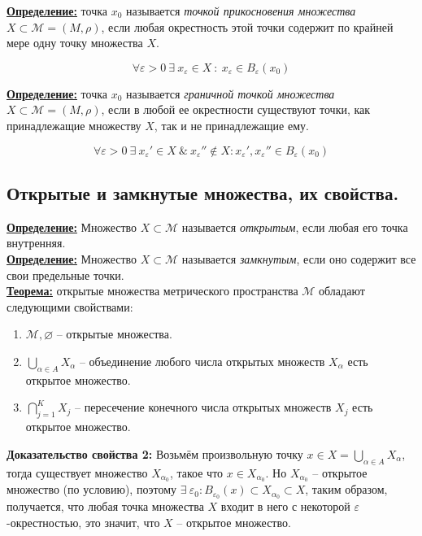 \documentclass[a4paper,12pt]{article} %
\begin{document}
	\underline{\textbf{Определение:}} точка $x_0$ называется \textit{точкой прикосновения множества} $X \subset \mathscr{M} = (M, \rho)$, если любая окрестность этой точки содержит по крайней мере одну точку множества $X$.
	
	\[ \forall \varepsilon > 0 ~ \exists ~ x_{\varepsilon} \in X ~ : ~ x_{\varepsilon} \in B_{\varepsilon}(x_0) \]
	
	\underline{\textbf{Определение:}} точка $x_0$ называется \textit{граничной точкой множества}  $X \subset \mathscr{M} = (M, \rho)$, если в любой ее окрестности существуют точки, как принадлежащие множеству $X$, так и не принадлежащие ему.
	
	\[ \forall \varepsilon > 0 ~ \exists ~ x_{\varepsilon}' \in X ~ \& ~ x_{\varepsilon}'' \notin X : x_{\varepsilon}', x_{\varepsilon}'' \in B_{\varepsilon}(x_0)\]
	
	\subsection{Открытые и замкнутые множества, их свойства.}
	
	\underline{\textbf{Определение:}} Множество $X \subset \mathscr{M}$ называется \textit{открытым}, если любая его точка внутренняя.\\
	
	\underline{\textbf{Определение:}} Множество $X \subset \mathscr{M}$ называется \textit{замкнутым}, если оно содержит все свои предельные точки.\\
	
	\underline{\textbf{Теорема:}} открытые множества метрического пространства $\mathscr{M}$ обладают следующими свойствами:
	
	\begin{enumerate}
		\item $\mathscr{M}, \varnothing$ -- открытые множества.
		\item $\bigcup \limits_{\alpha \in A} X_{\alpha}$ -- объединение любого числа открытых множеств $X_{\alpha}$ есть открытое множество.
		\item $\bigcap \limits_{j = 1}^K X_j$ -- пересечение конечного числа открытых множеств $X_j$ есть открытое множество.
	\end{enumerate}
	
	\textbf{Доказательство свойства 2:} Возьмём произвольную точку $x \in X = \bigcup \limits_{\alpha \in A} X_{\alpha}$, тогда существует множество $X_{\alpha_0}$, такое что $x \in X_{\alpha_0}$. Но $X_{\alpha_0}$ -- открытое множество (по условию), поэтому $\exists ~ \varepsilon_0 : B_{\varepsilon_0}(x) \subset X_{\alpha_0} \subset X$, таким образом, получается, что любая точка множества $X$ входит в него с некоторой $\varepsilon$-окрестностью, это значит, что $X$ -- открытое множество.\\
	
\end{document}
